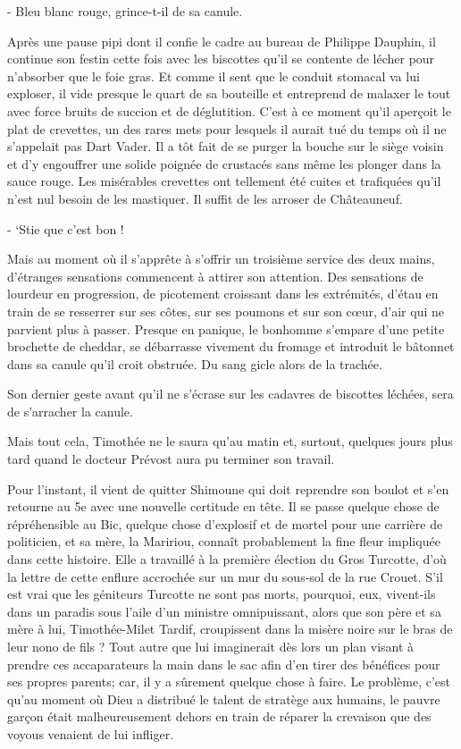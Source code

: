 - Bleu blanc rouge, grince-t-il de sa canule.

Après une pause pipi dont il confie le cadre au bureau de Philippe Dauphin, il continue son festin cette fois avec les biscottes qu’il se contente de lécher pour n’absorber que le foie gras. Et comme il sent que le conduit stomacal va lui exploser, il vide presque le quart de sa bouteille et entreprend de malaxer le tout avec force bruits de succion et de déglutition. C’est à ce moment qu’il aperçoit le plat de crevettes, un des rares mets pour lesquels il aurait tué du temps où il ne s’appelait pas Dart Vader. Il a tôt fait de se purger la bouche sur le siège voisin et d’y engouffrer une solide poignée de crustacés sans même les plonger dans la sauce rouge. Les misérables crevettes ont tellement été cuites et trafiquées qu’il n’est nul besoin de les mastiquer. Il suffit de les arroser de Châteauneuf.

- ‘Stie que c’est bon !

Mais au moment où il s’apprête à s’offrir un troisième service des deux mains, d’étranges sensations commencent à attirer son attention. Des sensations de lourdeur en progression, de picotement croissant dans les extrémités, d’étau en train de se resserrer sur ses côtes, sur ses poumons et sur son cœur, d’air qui ne parvient plus à passer. Presque en panique, le bonhomme s’empare d’une petite brochette de cheddar, se débarrasse vivement du fromage et introduit le bâtonnet dans sa canule qu’il croit obstruée. Du sang gicle alors de la trachée.

Son dernier geste avant qu’il ne s’écrase sur les cadavres de biscottes léchées, sera de s’arracher la canule.

Mais tout cela, Timothée ne le saura qu’au matin et, surtout, quelques jours plus tard quand le docteur Prévost aura pu terminer son travail.

Pour l’instant, il vient de quitter Shimoune qui doit reprendre son boulot et s’en retourne au 5e avec une nouvelle certitude en tête. Il se passe quelque chose de répréhensible au Bic, quelque chose d’explosif et de mortel pour une carrière de politicien, et sa mère, la Maririou, connaît probablement la fine fleur impliquée dans cette histoire. Elle a travaillé à la première élection du Gros Turcotte, d’où la lettre de cette enflure accrochée sur un mur du sous-sol de la rue Crouet. S’il est vrai que les géniteurs Turcotte ne sont pas morts, pourquoi, eux, vivent-ils dans un paradis sous l’aile d’un ministre omnipuissant, alors que son père et sa mère à lui, Timothée-Milet Tardif, croupissent dans la misère noire sur le bras de leur nono de fils ? Tout autre que lui imaginerait dès lors un plan visant à prendre ces accaparateurs la main dans le sac afin d’en tirer des bénéfices pour ses propres parents; car, il y a sûrement quelque chose à faire. Le problème, c’est qu’au moment où Dieu a distribué le talent de stratège aux humains, le pauvre garçon était malheureusement dehors en train de réparer la crevaison que des voyous venaient de lui infliger.

